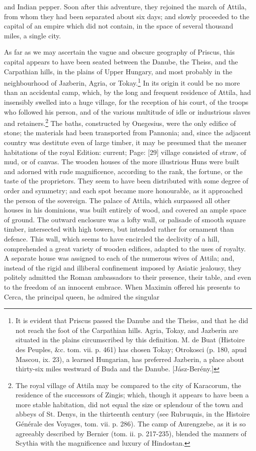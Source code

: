 and Indian pepper. Soon after this adventure, they rejoined the march of Attila, from whom they had been separated about six days; and slowly proceeded to the capital of an empire which did not contain, in the space of several thousand miles, a single city.

As far as we may ascertain the vague and obscure geography of Priscus, this capital appears to have been seated between the Danube, the Theiss, and the Carpathian hills, in the plains of Upper Hungary, and most probably in the neighbourhood of Jazberin, Agria, or Tokay.\footnote{It is evident that Priscus passed the Danube and the Theiss, and that he did not reach the foot of the Carpathian hills. Agria, Tokay, and Jazberin are situated in the plains circumscribed by this definition. M. de Buat (Histoire des Peuples, \&c. tom. vii. p. 461) has chosen Tokay; Otrokosci (p. 180, apud Mascou, ix. 23), a learned Hungarian, has preferred Jazberin, a place about thirty-six miles westward of Buda and the Danube. [Jász-Berény.]} In its origin it could be no more than an accidental camp, which, by the long and frequent residence of Attila, had insensibly swelled into a huge village, for the reception of his court, of the troops who followed his person, and of the various multitude of idle or industrious slaves and retainers.\footnote{The royal village of Attila may be compared to the city of Karacorum, the residence of the successors of Zingis; which, though it appears to have been a more stable habitation, did not equal the size or splendour of the town and abbeys of St. Denys, in the thirteenth century (see Rubruquis, in the Histoire Générale des Voyages, tom. vii. p. 286). The camp of Aurengzebe, as it is so agreeably described by Bernier (tom. ii. p. 217-235), blended the manners of Scythia with the magnificence and luxury of Hindostan.} The baths, constructed by Onegesius, were the only edifice of stone; the materials had been transported from Pannonia; and, since the adjacent country was destitute even of large timber, it may be presumed that the meaner habitations of the royal Edition: current; Page: [29] village consisted of straw, of mud, or of canvas. The wooden houses of the more illustrious Huns were built and adorned with rude magnificence, according to the rank, the fortune, or the taste of the proprietors. They seem to have been distributed with some degree of order and symmetry; and each spot became more honourable, as it approached the person of the sovereign. The palace of Attila, which surpassed all other houses in his dominions, was built entirely of wood, and covered an ample space of ground. The outward enclosure was a lofty wall, or palisade of smooth square timber, intersected with high towers, but intended rather for ornament than defence. This wall, which seems to have encircled the declivity of a hill, comprehended a great variety of wooden edifices, adapted to the uses of royalty. A separate house was assigned to each of the numerous wives of Attila; and, instead of the rigid and illiberal confinement imposed by Asiatic jealousy, they politely admitted the Roman ambassadors to their presence, their table, and even to the freedom of an innocent embrace. When Maximin offered his presents to Cerca, the principal queen, he admired the singular 